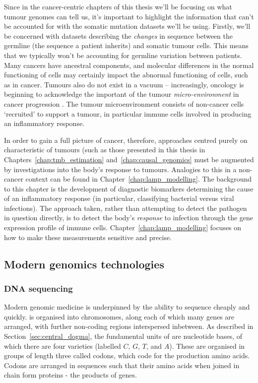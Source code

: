 \documentclass[thesis.tex]{subfiles}
\begin{document}
Since in the cancer-centric chapters of this thesis we'll be focusing on what tumour genomes can tell us, it's important to highlight the information that can't be accounted for with the somatic mutation datasets we'll be using. Firstly, we'll be concerned with datasets describing the \emph{changes} in  sequence between the germline (the  sequence a patient inherits) and somatic tumour cells. This means that we typically won't be accounting for germline variation between patients. Many cancers have ancestral components, and molecular differences in the normal functioning of cells may certainly impact the abnormal functioning of cells, such as in cancer. Tumours also do not exist in a vacuum -- increasingly, oncology is beginning to acknowledge the important of the tumour \emph{micro-environment} in cancer progression \citep{whiteside_tumor_2008}. The tumour microenvironment consists of non-cancer cells `recruited' to support a tumour, in particular immune cells involved in producing an inflammatory response.

In order to gain a full picture of cancer, therefore, approaches centred purely on characteristic of tumours (such as those presented in this thesis in Chapters~\ref{chap:tmb_estimation} and~\ref{chap:causal_genomics} must be augmented by investigations into the body's response to tumours. Analogies to this in a non-cancer context can be found in Chapter~\ref{chap:lamp_modelling}. The background to this chapter is the development of diagnostic biomarkers determining the cause of an inflammatory response (in particular, classifying bacterial versus viral infections). The approach taken, rather than attempting to detect the pathogen in question directly, is to detect the body's \emph{response} to infection through the gene expression profile of immune cells. Chapter~\ref{chap:lamp_modelling} focuses on how to make these measurements sensitive and precise.

\subsection{Modern genomics technologies} \label{sec:sequencing}
\subsubsection{DNA sequencing}
Modern genomic medicine is underpinned by the ability to sequence  cheaply and quickly.  is organised into chromosomes, along each of which many genes are arranged, with further non-coding regions interspersed inbetween. As described in Section~\ref{sec:central_dogma}, the fundamental units of  are nucleotide bases, of which there are four varieties (labelled $C$, $G$, $T$, and $A$). These are organised in groups of length three called codons, which code for the production amino acids. Codons are arranged in sequences such that their amino acids when joined in chain form proteins - the products of genes. 
\end{document}
